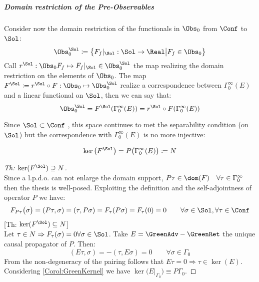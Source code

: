 \documentclass[Main]{subfiles}
\begin{document}
			\subparagraph{Domain restriction of the Pre-Observables} 
			  		
				Consider now the domain restriction of the functionals in $\Obs_0$ from $\Conf$ to $\Sol$:
   					\begin{displaymath}
   						\Obs_0^\Sol \coloneqq \big\{F_f\vert_\Sol : \Sol \rightarrow \Real \big \vert F_f \in \Obs_0 \big\}
   					\end{displaymath}
				Call $r^\Sol : \Obs_0 F_f \mapsto F_f \vert_\Sol \in \Obs_0^\Sol$ the map realizing the domain restriction on the elements of $\Obs_0$.
				The map $F^\Sol \coloneqq r^\Sol \circ F : \Obs_0 \mapsto \Obs_0^\Sol $ realize a correspondence between $\Gamma_0^\infty(E)$ and a linear functional on $\Sol$, then we can say that:
				\begin{displaymath}
					\Obs_0^\Sol = F^\Sol ( \Gamma_0^\infty(E)) = r^\Sol \circ F (\Gamma_0^\infty(E)) 
				\end{displaymath}				   					
   					
   				Since $\Sol \subset \Conf$ , this space continues to met the separability condition (on $\Sol$) but the correspondence with  $\Gamma_0^\infty(E)$ is no more injective:
					\begin{proposition}\label{Teo:NspaceDefinition}
						\begin{displaymath}
							\ker \big( F^\Sol \big) = P \big( \Gamma_0^\infty (E) \big)	\coloneqq N	
						\end{displaymath}
					\end{proposition}
					\begin{proof}
					[Th: $\ker(F^\Sol) \supseteq N$]\\
					Since a l.p.d.o. can not enlarge the domain support, $ P \tau \in \dom(F) \quad \forall \tau \in \Gamma_0^\infty$ then the thesis is well-posed.
					Exploiting the definition and the self-adjointness of operator $P$ we have:
					\begin{displaymath}
						F_{P\tau} \big( \sigma \big) = ( P\tau, \sigma) = (\tau, P\sigma) = F_\tau (P\sigma)= F_\tau(0) = 0 \qquad \forall \sigma \in \Sol, \forall \tau \in \Conf
					\end{displaymath}
					[Th: $\ker(F^\Sol) \subseteq N$]\\			
					Let $	\tau \in N \Rightarrow F_\tau (\sigma) =0 \forall \sigma \in \Sol$.
					Take $E= \GreenAdv- \GreenRet$	 the unique causal propagator of $P$.
					Then:
					\begin{displaymath}
						(E \tau , \sigma) = - (\tau , E \sigma) = 0 \qquad \forall \sigma \in \Gamma_0
					\end{displaymath}								
					From the non-degeneracy of the pairing follows that $E\tau = 0 \Rightarrow  \tau \in \ker(E)$.
					Considering \ref{Corol:GreenKernel} we have $ \ker \big(E\big\vert_{\Gamma_0} \big) \equiv P \Gamma_0$.
					\end{proof}
   			
\end{document}
